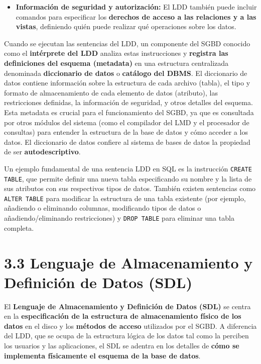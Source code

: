 \begin{itemize}
    \item \textbf{Información de seguridad y autorización:} El LDD también puede incluir comandos para especificar los \textbf{derechos de acceso a las relaciones y a las vistas}, definiendo quién puede realizar qué operaciones sobre los datos.
\end{itemize}

Cuando se ejecutan las sentencias del LDD, un componente del SGBD conocido como el \textbf{intérprete del LDD} analiza estas instrucciones y \textbf{registra las definiciones del esquema (metadata)} en una estructura centralizada denominada \textbf{diccionario de datos} o \textbf{catálogo del DBMS}. El diccionario de datos contiene información sobre la estructura de cada archivo (tabla), el tipo y formato de almacenamiento de cada elemento de datos (atributo), las restricciones definidas, la información de seguridad, y otros detalles del esquema. Esta metadata es crucial para el funcionamiento del SGBD, ya que es consultada por otros módulos del sistema (como el compilador del LMD y el procesador de consultas) para entender la estructura de la base de datos y cómo acceder a los datos. El diccionario de datos confiere al sistema de bases de datos la propiedad de ser \textbf{autodescriptivo}.

Un ejemplo fundamental de una sentencia LDD en SQL es la instrucción \texttt{CREATE TABLE}, que permite definir una nueva tabla especificando su nombre y la lista de sus atributos con sus respectivos tipos de datos. También existen sentencias como \texttt{ALTER TABLE} para modificar la estructura de una tabla existente (por ejemplo, añadiendo o eliminando columnas, modificando tipos de datos o añadiendo/eliminando restricciones) y \texttt{DROP TABLE} para eliminar una tabla completa.

\section{3.3 Lenguaje de Almacenamiento y Definición de Datos (SDL)}

El \textbf{Lenguaje de Almacenamiento y Definición de Datos (SDL)} se centra en la \textbf{especificación de la estructura de almacenamiento físico de los datos} en el disco y los \textbf{métodos de acceso} utilizados por el SGBD. A diferencia del LDD, que se ocupa de la estructura lógica de los datos tal como la perciben los usuarios y las aplicaciones, el SDL se adentra en los detalles de \textbf{cómo se implementa físicamente el esquema de la base de datos}.

